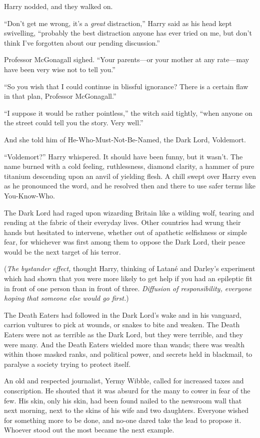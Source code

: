 Harry nodded, and they walked on.

“Don’t get me wrong, it’s a \emph{great} distraction,” Harry said as his head kept swivelling, “probably the best distraction anyone has ever tried on me, but don’t think I’ve forgotten about our pending discussion.”

Professor McGonagall sighed.
“Your parents—or your mother at any rate—may have been very wise not to tell you.”

“So you wish that I could continue in blissful ignorance? There is a certain flaw in that plan, Professor McGonagall.”

“I suppose it would be rather pointless,” the witch said tightly, “when anyone on the street could tell you the story. Very well.”

And she told him of He-Who-Must-Not-Be-Named, the Dark Lord, Voldemort.

“Voldemort?” Harry whispered. It should have been funny, but it wasn’t. The name burned with a cold feeling, ruthlessness, diamond clarity, a hammer of pure titanium descending upon an anvil of yielding flesh. A chill swept over Harry even as he pronounced the word, and he resolved then and there to use safer terms like You-Know-Who.

The Dark Lord had raged upon wizarding Britain like a wilding wolf, tearing and rending at the fabric of their everyday lives. Other countries had wrung their hands but hesitated to intervene, whether out of apathetic selfishness or simple fear, for whichever was first among them to oppose the Dark Lord, their peace would be the next target of his terror.

(\emph{The bystander effect,} thought Harry, thinking of Latané and Darley’s experiment which had shown that you were more likely to get help if you had an epileptic fit in front of one person than in front of three. \emph{Diffusion of responsibility, everyone hoping that someone else would go first.})

The Death Eaters had followed in the Dark Lord’s wake and in his vanguard, carrion vultures to pick at wounds, or snakes to bite and weaken. The Death Eaters were not as terrible as the Dark Lord, but they were terrible, and they were many. And the Death Eaters wielded more than wands; there was wealth within those masked ranks, and political power, and secrets held in blackmail, to paralyse a society trying to protect itself.

An old and respected journalist, Yermy Wibble, called for increased taxes and conscription. He shouted that it was absurd for the many to cower in fear of the few. His skin, only his skin, had been found nailed to the newsroom wall that next morning, next to the skins of his wife and two daughters. Everyone wished for something more to be done, and no-one dared take the lead to propose it. Whoever stood out the most became the next example.

